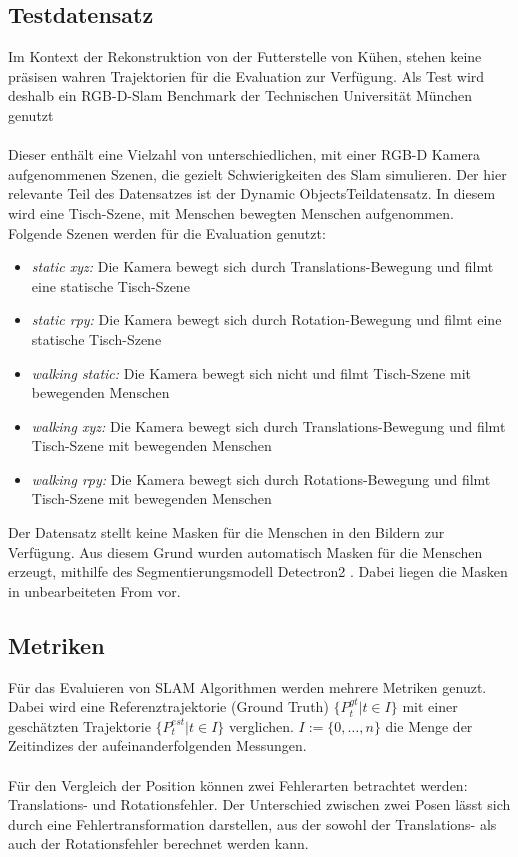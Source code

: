 \documentclass[12pt,DIV=15,BCOR=15mm,twoside,headsepline,abstract=true,listof=totoc,bibliography=totoc]{scrreprt}
\theoremstyle{remark}    %
\begin{document}
    \subsection{Testdatensatz}
    Im Kontext der Rekonstruktion von der Futterstelle von Kühen, stehen keine präsisen wahren Trajektorien für 
    die Evaluation zur Verfügung. Als Test wird deshalb ein \ac{RGB-D}-Slam Benchmark der Technischen Universität München genutzt \cite{sturm12iros}\\\\
    Dieser enthält eine Vielzahl von unterschiedlichen, mit einer \ac{RGB-D} Kamera aufgenommenen Szenen, die gezielt Schwierigkeiten
    des Slam simulieren. Der hier relevante Teil des Datensatzes ist der \glqq Dynamic Objects\grqq  Teildatensatz. In diesem wird eine Tisch-Szene, mit Menschen
    bewegten Menschen aufgenommen. Folgende Szenen werden für die Evaluation genutzt:
    \begin{itemize}
        \item \emph{static xyz:} Die Kamera bewegt sich durch Translations-Bewegung und filmt eine statische Tisch-Szene
        \item \emph{static rpy:} Die Kamera bewegt sich durch Rotation-Bewegung und filmt eine statische Tisch-Szene
        \item \emph{walking static:} Die Kamera bewegt sich nicht und filmt Tisch-Szene mit bewegenden Menschen
        \item \emph{walking xyz:} Die Kamera bewegt sich durch Translations-Bewegung und filmt Tisch-Szene mit bewegenden Menschen
        \item \emph{walking rpy:} Die Kamera bewegt sich durch Rotations-Bewegung und filmt Tisch-Szene mit bewegenden Menschen
    \end{itemize}
    Der Datensatz stellt keine Masken für die Menschen in den Bildern zur Verfügung. Aus diesem Grund wurden automatisch Masken für die Menschen erzeugt, mithilfe des 
    Segmentierungsmodell Detectron2 \cite{wu2019detectron2}.  Dabei liegen die Masken in unbearbeiteten From vor.

    \subsection{Metriken}
    Für das Evaluieren von \ac{SLAM} Algorithmen werden mehrere Metriken genuzt. Dabei wird eine Referenztrajektorie (Ground Truth) $\{P^{gt}_t| t \in I\}$ 
    mit einer geschätzten Trajektorie $\{P^{est}_t| t \in I\}$ verglichen. $I:= \{0, \ldots, n\}$ die Menge der Zeitindizes der aufeinanderfolgenden Messungen.\\\\
    Für den Vergleich der Position können zwei Fehlerarten betrachtet werden: Translations- und Rotationsfehler.
    Der Unterschied zwischen zwei Posen lässt sich durch eine Fehlertransformation darstellen, aus der sowohl der Translations- als auch 
    der Rotationsfehler berechnet werden kann.
\end{document}
